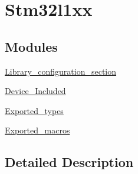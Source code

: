 \hypertarget{group__stm32l1xx}{\section{Stm32l1xx}
\label{group__stm32l1xx}
}
\subsection*{Modules}
\begin{DoxyCompactItemize}
\item 
\hyperlink{group___library__configuration__section}{Library\-\_\-configuration\-\_\-section}
\item 
\hyperlink{group___device___included}{Device\-\_\-\-Included}
\item 
\hyperlink{group___exported__types}{Exported\-\_\-types}
\item 
\hyperlink{group___exported__macros}{Exported\-\_\-macros}
\end{DoxyCompactItemize}


\subsection{Detailed Description}
